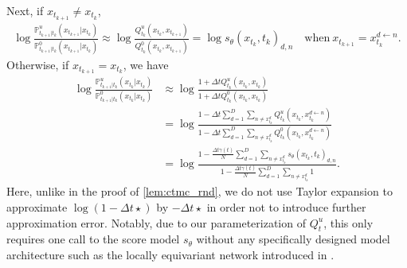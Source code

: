 \documentclass{article}
\theoremstyle{remark}
\renewcommand{\P}{\mathbb{P}}
\begin{document}
Next, if $x_{t_{k+1}}\ne x_{t_k}$, 
\begin{align}
    \log\frac{\P^u_{t_{k+1}|t_k}(x_{t_{k+1}}|x_{t_k})}{\P^0_{t_{k+1}|t_k}(x_{t_{k+1}}|x_{t_k})}\approx\log\frac{Q^u_{t_k}(x_{t_k},x_{t_{k+1}})}{Q^0_{t_k}(x_{t_k},x_{t_{k+1}})}=\log s_\theta(x_{t_k},t_k)_{d,n}\quad\text{when}~x_{t_{k+1}}=x_{t_k}^{d\gets n}.
    \label{eq:unif_log_ratio_changed}
\end{align}
Otherwise, if $x_{t_{k+1}}=x_{t_k}$, we have
\begin{align}
    \log\frac{\P^u_{t_{k+1}|t_k}(x_{t_k}|x_{t_k})}{\P^0_{t_{k+1}|t_k}(x_{t_k}|x_{t_k})}&\approx\log\frac{1+\Delta tQ^u_{t_k}(x_{t_k},x_{t_k})}{1+\Delta tQ^0_{t_k}(x_{t_k},x_{t_k})}\nonumber\\
    &=\log\frac{1-\Delta t\sum_{d=1}^D\sum_{n\ne x_{t_k}^d}Q^u_{t_k}(x_{t_k},x_{t_k}^{d\gets n})}{1-\Delta t\sum_{d=1}^D\sum_{n\ne x_{t_k}^d}Q^0_{t_k}(x_{t_k},x_{t_k}^{d\gets n})}\nonumber\\
    &=\log\frac{1-\frac{\Delta t\gamma(t)}{N}\sum_{d=1}^D\sum_{n\ne x_{t_k}^d}s_\theta(x_{t_k},t_k)_{d,n}}{1-\frac{\Delta t\gamma(t)}{N}\sum_{d=1}^D\sum_{n\ne x_{t_k}^d}1}.
    \label{eq:unif_log_ratio_unchanged}
\end{align}
Here, unlike in the proof of \cref{lem:ctmc_rnd}, we do not use Taylor expansion to approximate $\log(1-\Delta t\star)$ by $-\Delta t\star$ in order not to introduce further approximation error. Notably, due to our parameterization of $Q^u_t$, this only requires one call to the score model $s_\theta$ without any specifically designed model architecture such as the locally equivariant network introduced in \cite{holderrieth2025leaps}.
\end{document}
